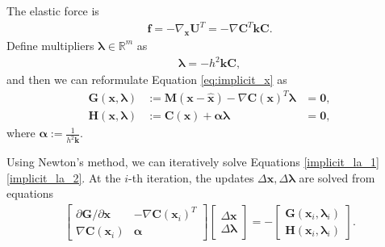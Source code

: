\documentclass[conference]{IEEEtran}
\begin{document}
The elastic force is
\begin{align}
    \mathbf f = -\nabla_{\mathbf x} \mathbf U ^T = - \nabla \mathbf C^T \mathbf k \mathbf C. 
\end{align}
Define multipliers $\boldsymbol \lambda \in \mathbb R^{m}$ as 
\begin{align}
    \boldsymbol \lambda = -h^2\mathbf k \mathbf C,
\end{align}
and then we can reformulate Equation \ref{eq:implicit_x} as
\begin{align}
    \mathbf G(\mathbf x, \boldsymbol{\lambda}) &:= \mathbf M (\mathbf x - \mathbf {\hat x}) - \nabla \mathbf C (\mathbf x) ^T \boldsymbol \lambda &= \mathbf 0, \label{implicit_la_1}\\
    \mathbf H(\mathbf x, \boldsymbol{\lambda}) &:= \mathbf C(\mathbf x) + \boldsymbol{\alpha} \boldsymbol \lambda &= \mathbf 0, \label{implicit_la_2}
\end{align}
where $\boldsymbol \alpha := \frac{1}{h^2 \mathbf k}$. 

Using Newton's method, we can iteratively solve Equations \ref{implicit_la_1} \ref{implicit_la_2}. At the $i$-th iteration, the updates $\Delta \mathbf x, \Delta \boldsymbol \lambda$ are solved from equations
\begin{align}
    \begin{bmatrix}
        \partial \mathbf G / \partial \mathbf x & -\nabla \mathbf C (\mathbf x_i) ^T \\
        \nabla \mathbf C (\mathbf x_i) & \boldsymbol{\alpha}
    \end{bmatrix} 
    \begin{bmatrix}
        \Delta \mathbf x \\
        \Delta \boldsymbol{\lambda}
    \end{bmatrix} = 
    -\begin{bmatrix}
        \mathbf G(\mathbf x_i, \boldsymbol{\lambda}_i) \\
        \mathbf H(\mathbf x_i, \boldsymbol{\lambda}_i)
    \end{bmatrix}. \label{update_wo_approx}
\end{align}
\end{document}
